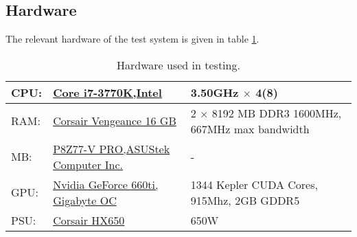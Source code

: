 \subsection{Hardware}
The relevant hardware of the test system is given in table \ref{tab:hardware}.
\begin{table}[!htbp]
\begin{sloppypar}
	\begin{tabular}{|| p{1cm} | p{5cm} | p{5cm} ||}
	\hline
		CPU:&		\href{http://ark.intel.com/products/65523}{Core i7-3770K,\newline Intel} &
			3.50GHz $\times$ 4(8) \\ \hline
		RAM:&	\href{http://www.corsair.com/en/vengeancer-16gb-dual-channel-ddr3-memory-kit-cmz16gx3m2a1600c9g}{Corsair Vengeance 16 GB} &
			2 $\times$ 8192 MB DDR3 1600MHz, 667MHz max bandwidth\\ \hline
		MB:&		\href{http://www.asus.com/Motherboards/P8Z77V_PRO/}{P8Z77-V PRO,\newline ASUStek Computer Inc.} &
			-\\ \hline
		GPU:&		\href{http://www.gigabyte.com/products/product-page.aspx?pid=4319\#ov}{Nvidia GeForce 660ti, Gigabyte OC} &
			1344 Kepler CUDA Cores, 915Mhz, 2GB GDDR5\\ \hline
		PSU:&		\href{http://www.corsair.com/en/hx-series-hx650-power-supply-650-watt-80-plus-gold-certified-modular-psu}{Corsair HX650} &
			650W\\
	\hline
	\end{tabular}
\end{sloppypar}
\caption{Hardware used in testing.}
\label{tab:hardware}
\end{table}

